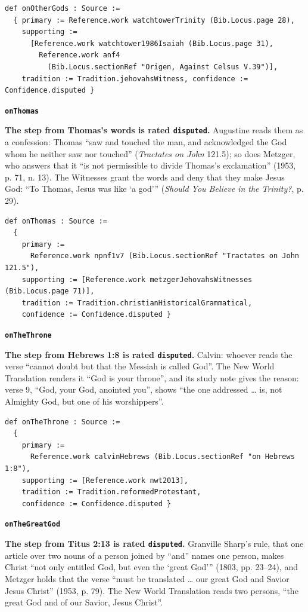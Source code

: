 \documentclass[11pt,paper=\testimonypaper,DIV=13,parskip=false]{scrartcl}
\begin{document}
{\small\begin{verbatim}
def onOtherGods : Source :=
  { primary := Reference.work watchtowerTrinity (Bib.Locus.page 28),
    supporting :=
      [Reference.work watchtower1986Isaiah (Bib.Locus.page 31),
        Reference.work anf4
          (Bib.Locus.sectionRef "Origen, Against Celsus V.39")],
    tradition := Tradition.jehovahsWitness, confidence := Confidence.disputed }
\end{verbatim}}
\par\medskip\noindent\textbf{\texttt{on\allowbreak{}Thomas}}\par\nobreak\noindent
\textbf{The step from Thomas’s words is rated \texttt{disputed}.} Augustine reads them as a confession: Thomas “saw and touched the man, and acknowledged the God whom he neither saw nor touched” (\emph{Tractates on John} 121.5); so does Metzger, who answers that it “is not permissible to divide Thomas’s exclamation” (1953, p. 71, n. 13). The Witnesses grant the words and deny that they make Jesus God: “To Thomas, Jesus was like ‘a god’” (\emph{Should You Believe in the Trinity?}, p. 29).

{\small\begin{verbatim}
def onThomas : Source :=
  {
    primary :=
      Reference.work npnf1v7 (Bib.Locus.sectionRef "Tractates on John 121.5"),
    supporting := [Reference.work metzgerJehovahsWitnesses (Bib.Locus.page 71)],
    tradition := Tradition.christianHistoricalGrammatical,
    confidence := Confidence.disputed }
\end{verbatim}}
\par\medskip\noindent\textbf{\texttt{on\allowbreak{}The\allowbreak{}Throne}}\par\nobreak\noindent
\textbf{The step from Hebrews 1:8 is rated \texttt{disputed}.} Calvin: whoever reads the verse “cannot doubt but that the Messiah is called God”. The New World Translation renders it “God is your throne”, and its study note gives the reason: verse 9, “God, your God, anointed you”, shows “the one addressed … is, not Almighty God, but one of his worshippers”.

{\small\begin{verbatim}
def onTheThrone : Source :=
  {
    primary :=
      Reference.work calvinHebrews (Bib.Locus.sectionRef "on Hebrews 1:8"),
    supporting := [Reference.work nwt2013],
    tradition := Tradition.reformedProtestant,
    confidence := Confidence.disputed }
\end{verbatim}}
\par\medskip\noindent\textbf{\texttt{on\allowbreak{}The\allowbreak{}Great\allowbreak{}God}}\par\nobreak\noindent
\textbf{The step from Titus 2:13 is rated \texttt{disputed}.} Granville Sharp’s rule, that one article over two nouns of a person joined by “and” names one person, makes Christ “not only entitled God, but even the ‘great God’” (1803, pp. 23–24), and Metzger holds that the verse “must be translated … our great God and Savior Jesus Christ” (1953, p. 79). The New World Translation reads two persons, “the great God and of our Savior, Jesus Christ”.
\end{document}
